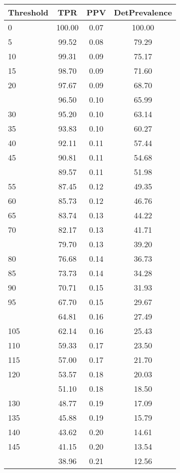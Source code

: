 \begin{table}[ht]
\centering
\begin{tabular}{lccc}
  \toprule
Threshold & TPR & PPV & DetPrevalence \\ 
  \midrule
0 & 100.00 & 0.07 & 100.00 \\ 
  5 & 99.52 & 0.08 & 79.29 \\ 
  10 & 99.31 & 0.09 & 75.17 \\ 
  15 & 98.70 & 0.09 & 71.60 \\ 
  20 & 97.67 & 0.09 & 68.70 \\ 
   \addlinespace
25 & 96.50 & 0.10 & 65.99 \\ 
  30 & 95.20 & 0.10 & 63.14 \\ 
  35 & 93.83 & 0.10 & 60.27 \\ 
  40 & 92.11 & 0.11 & 57.44 \\ 
  45 & 90.81 & 0.11 & 54.68 \\ 
   \addlinespace
50 & 89.57 & 0.11 & 51.98 \\ 
  55 & 87.45 & 0.12 & 49.35 \\ 
  60 & 85.73 & 0.12 & 46.76 \\ 
  65 & 83.74 & 0.13 & 44.22 \\ 
  70 & 82.17 & 0.13 & 41.71 \\ 
   \addlinespace
75 & 79.70 & 0.13 & 39.20 \\ 
  80 & 76.68 & 0.14 & 36.73 \\ 
  85 & 73.73 & 0.14 & 34.28 \\ 
  90 & 70.71 & 0.15 & 31.93 \\ 
  95 & 67.70 & 0.15 & 29.67 \\ 
   \addlinespace
100 & 64.81 & 0.16 & 27.49 \\ 
  105 & 62.14 & 0.16 & 25.43 \\ 
  110 & 59.33 & 0.17 & 23.50 \\ 
  115 & 57.00 & 0.17 & 21.70 \\ 
  120 & 53.57 & 0.18 & 20.03 \\ 
   \addlinespace
125 & 51.10 & 0.18 & 18.50 \\ 
  130 & 48.77 & 0.19 & 17.09 \\ 
  135 & 45.88 & 0.19 & 15.79 \\ 
  140 & 43.62 & 0.20 & 14.61 \\ 
  145 & 41.15 & 0.20 & 13.54 \\ 
   \addlinespace
150 & 38.96 & 0.21 & 12.56 \\ 

\end{tabular}
\end{table}
